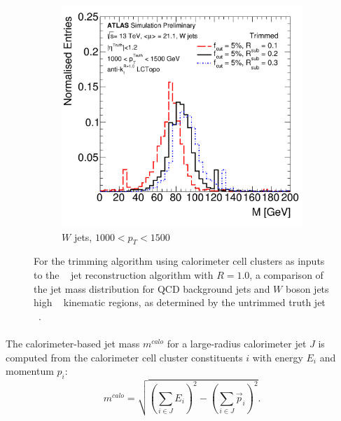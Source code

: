 \begin{figure}[htbp!]
\begin{subfigure}[b]{0.4\textwidth}
        \includegraphics[width=\textwidth]{figures/object/trim_w_highpt}
        \caption{$W$ jets, $1000 < p_{T} < 1500$ \GeV}
        \label{fig:obj_trim_w_highpt}
    \end{subfigure}
   \caption{
   For the trimming algorithm using calorimeter cell clusters as inputs to the \akt~ jet reconstruction algorithm with $R = 1.0$, a comparison of the jet mass distribution for QCD background jets and $W$ boson jets high \pt~ kinematic regions, as determined by the untrimmed truth jet \pt~.}
  \label{fig:obj_trim-highpt}
\end{figure}

\paragraph{}
The calorimeter-based jet mass $m^{calo}$ for  a large-radius calorimeter jet $J$ is computed from the calorimeter cell cluster constituents $i$ with energy $E_i$ and momentum $p_i$:
\begin{equation}
m^{calo} = \sqrt{\left(\sum_{i\in J}E_i\right)^2-\left(\sum_{i\in J}\vec{p}_i\right)^2}.
\end{equation}

